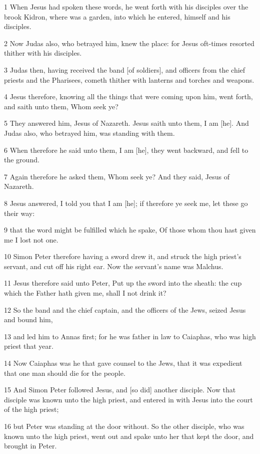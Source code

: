 \par 1 When Jesus had spoken these words, he went forth with his disciples over the brook Kidron, where was a garden, into which he entered, himself and his disciples.
\par 2 Now Judas also, who betrayed him, knew the place: for Jesus oft-times resorted thither with his disciples.
\par 3 Judas then, having received the band [of soldiers], and officers from the chief priests and the Pharisees, cometh thither with lanterns and torches and weapons.
\par 4 Jesus therefore, knowing all the things that were coming upon him, went forth, and saith unto them, Whom seek ye?
\par 5 They answered him, Jesus of Nazareth. Jesus saith unto them, I am [he]. And Judas also, who betrayed him, was standing with them.
\par 6 When therefore he said unto them, I am [he], they went backward, and fell to the ground.
\par 7 Again therefore he asked them, Whom seek ye? And they said, Jesus of Nazareth.
\par 8 Jesus answered, I told you that I am [he]; if therefore ye seek me, let these go their way:
\par 9 that the word might be fulfilled which he spake, Of those whom thou hast given me I lost not one.
\par 10 Simon Peter therefore having a sword drew it, and struck the high priest's servant, and cut off his right ear. Now the servant's name was Malchus.
\par 11 Jesus therefore said unto Peter, Put up the sword into the sheath: the cup which the Father hath given me, shall I not drink it?
\par 12 So the band and the chief captain, and the officers of the Jews, seized Jesus and bound him,
\par 13 and led him to Annas first; for he was father in law to Caiaphas, who was high priest that year.
\par 14 Now Caiaphas was he that gave counsel to the Jews, that it was expedient that one man should die for the people.
\par 15 And Simon Peter followed Jesus, and [so did] another disciple. Now that disciple was known unto the high priest, and entered in with Jesus into the court of the high priest;
\par 16 but Peter was standing at the door without. So the other disciple, who was known unto the high priest, went out and spake unto her that kept the door, and brought in Peter.
